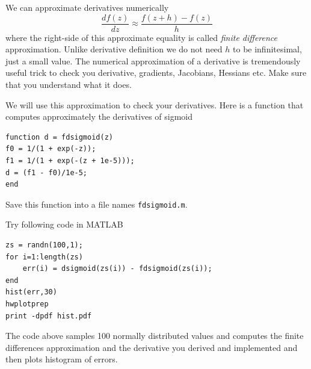 \documentclass{article}
\begin{document}
\newproblem{0.5pt}
We can approximate derivatives numerically
\[
\frac{df(z)}{dz}\approx \frac{f(z+h) - f(z)}{h}
\]
where the right-side of this approximate equality is called {\em finite difference} approximation. Unlike derivative definition we do not need $h$ to be infinitesimal, just a small value. The numerical approximation of a derivative is tremendously useful trick to check you derivative, gradients, Jacobians, Hessians etc. Make sure that you understand what it does.

We will use this approximation to check your derivatives. Here is a function that computes approximately the derivatives of sigmoid
\begin{verbatim}
function d = fdsigmoid(z)
f0 = 1/(1 + exp(-z));
f1 = 1/(1 + exp(-(z + 1e-5)));
d = (f1 - f0)/1e-5;
end
\end{verbatim}
Save this function into a file names \texttt{fdsigmoid.m}.

Try following code in MATLAB
\begin{verbatim}
zs = randn(100,1);
for i=1:length(zs)
    err(i) = dsigmoid(zs(i)) - fdsigmoid(zs(i));
end
hist(err,30)
hwplotprep
print -dpdf hist.pdf
\end{verbatim}
The code above samples 100 normally distributed values and computes the finite differences approximation and the derivative you derived and implemented and then plots histogram of errors.
\end{document}
